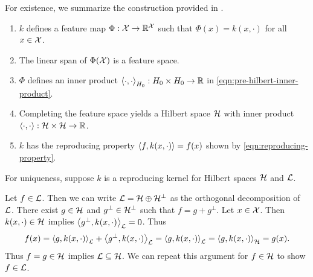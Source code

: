 For existence, we summarize the construction provided in .
\begin{enumerate}
    \item \(k\) defines a feature map \(\Phi : \mathcal{X} \to \mathbb{R}^{\mathcal{X}}\) such that \(\Phi(x) = k(x, \cdot)\) for all \(x \in \mathcal{X}\).
    \item The linear span of \(\Phi(\mathcal{X})\) is a feature space.
    \item \(\Phi\) defines an inner product \(\left\langle \cdot, \cdot \right\rangle_{H_0} : H_0 \times H_0 \to \mathbb{R}\) in \cref{eqn:pre-hilbert-inner-product}.
    \item Completing the feature space yields a Hilbert space \(\mathcal{H}\) with inner product \(\left\langle \cdot, \cdot \right\rangle : \mathcal{H} \times \mathcal{H} \to \mathbb{R}\).
    \item \(k\) has the reproducing property \(\left\langle f, k(x,\cdot) \right\rangle = f(x)\) shown by \cref{eqn:reproducing-property}.
\end{enumerate}
\def\L{\hilbert{L}}
\def\Hp{\H^{\perp}}
For uniqueness, suppose \(k\) is a reproducing kernel for Hilbert spaces \(\mathcal{H}\) and \(\L\).

Let \(f \in \L\).
Then we can write \(\L = \H \oplus \Hp\) as the orthogonal decomposition of \(\L\).
There exist \(g \in \mathcal{H}\) and \(g^\perp \in \Hp\) such that \(f = g + g^\perp\).
Let \(x \in \mathcal{X}\).
Then \(k(x,\cdot) \in \mathcal{H}\) implies \(\ipt{g^\perp,k(x,\cdot)}_{\L} = 0\).
Thus
\begin{equation}
    f(x)
    = \ipt{g,k(x,\cdot)}_{\L} + \ipt{g^\perp,k(x,\cdot)}_{\L}
    = \ipt{g,k(x,\cdot)}_{\L}
    = \ipt{g,k(x,\cdot)}_{\H}
    = g(x).
\end{equation}
Thus \(f = g \in \mathcal{H}\) implies \(\L \subseteq \H\).
We can repeat this argument for \(f \in \mathcal{H}\) to show \(f \in \L\).